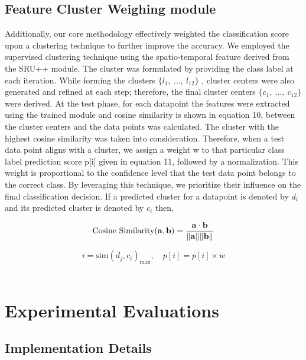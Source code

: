 \documentclass[runningheads]{llncs}
\begin{document}
\subsection{Feature Cluster Weighing module}
Additionally, our core methodology effectively weighted the classification score upon a clustering technique to further improve the accuracy. We employed the supervised clustering technique using the spatio-temporal feature derived from the SRU++ module. The cluster was formulated by providing the class label at each iteration. While forming the clusters $\{l_1, \ \ldots, \ l_{12}\}$ , cluster centers were also generated and refined at each step; therefore, the final cluster centers $\{c_1, \ \ldots, \ c_{12}\}$ were derived. At the test phase, for each datapoint the features were extracted using the trained module and cosine similarity is shown in equation 10, between the cluster centers and the data points was calculated. The cluster with the highest cosine similarity was taken into consideration. Therefore, when a  test data point aligns with a cluster, we assign a weight w to that particular class label prediction score p[i] given in equation 11, followed by a normalization. This weight is proportional to the  confidence level that the test data point belongs to the correct class. By leveraging this technique, we prioritize their influence on the final classification decision. If a predicted cluster for a datapoint is denoted by $d_i$ and its predicted cluster is denoted by $c_i$ then,

\begin{equation}
  \text{Cosine Similarity}(\mathbf{a}, \mathbf{b}) = \frac{\mathbf{a} \cdot \mathbf{b}}{\|\mathbf{a}\| \|\mathbf{b}\|} \label{eq:cosine_similarity}  \\
\end{equation}

\begin{equation}
  i = \text{sim}(d_j, c_i)_{\text{max}} \label{eq:cluster}  ,
  \quad p[i] = p[i] \times w \label{eq:weight}  
\end{equation}\\

\section{Experimental Evaluations}

\subsection{Implementation Details}
\end{document}
